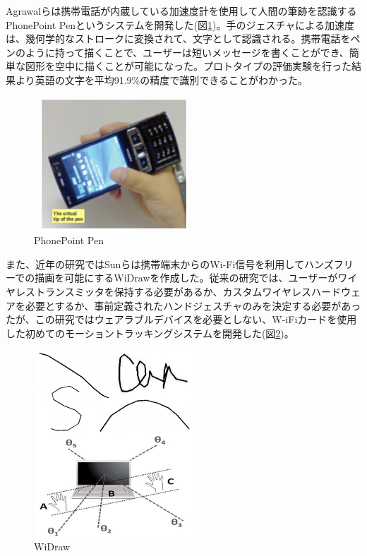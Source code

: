 \documentclass[11pt,a4j, titlepage]{jarticle} %
\begin{document}
Agrawalら\cite{agrawal}は携帯電話が内蔵している加速度計を使用して人間の筆跡を認識するPhonePoint Penというシステムを開発した(図\ref{fig:phonepointpen})。手のジェスチャによる加速度は、幾何学的なストロークに変換されて、文字として認識される。携帯電話をペンのように持って描くことで、ユーザーは短いメッセージを書くことができ、簡単な図形を空中に描くことが可能になった。プロトタイプの評価実験を行った結果より英語の文字を平均91.9\%の精度で識別できることがわかった。

\begin{figure}[H]
  \begin{center}
    \includegraphics[clip,height=5.0cm,width=6.0cm]{./phonepointpen.eps}
    \caption{PhonePoint Pen}
    \label{fig:phonepointpen}
  \end{center}
\end{figure}

また、近年の研究ではSunら\cite{sun}は携帯端末からのWi-Fi信号を利用してハンズフリーでの描画を可能にするWiDrawを作成した。従来の研究では、ユーザーがワイヤレストランスミッタを保持する必要があるか、カスタムワイヤレスハードウェアを必要とするか、事前定義されたハンドジェスチャのみを決定する必要があったが、この研究ではウェアラブルデバイスを必要としない、W-iFiカードを使用した初めてのモーショントラッキングシステムを開発した(図\ref{fig:widraw})。

\begin{figure}[H]
  \begin{center}
    \includegraphics[clip,height=7.0cm,width=6.0cm]{./widraw.eps}
    \caption{WiDraw}
    \label{fig:widraw}
  \end{center}
\end{figure}
\end{document}
